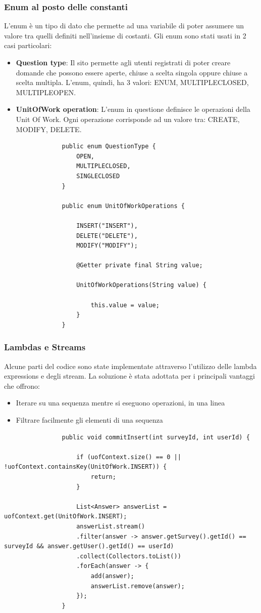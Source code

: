 \documentclass[12pt]{article}
\begin{document}
			\subsubsection{Enum al posto delle constanti}
			L'enum è un tipo di dato che permette ad una variabile di poter assumere un valore tra quelli definiti nell'insieme di costanti. Gli enum sono stati usati in 2 casi particolari:
			\begin{itemize}
				\item \textbf{Question type}: Il sito permette agli utenti registrati di poter creare domande che possono essere aperte, chiuse a scelta singola oppure chiuse a scelta multipla. L'enum, quindi, ha 3 valori: ENUM, MULTIPLECLOSED, MULTIPLEOPEN.
				\item \textbf{UnitOfWork operation}: L'enum in questione definisce le operazioni della Unit Of Work. Ogni operazione corrisponde ad un valore tra: CREATE, MODIFY, DELETE.
			\end{itemize}
			\begin{lstlisting}
				public enum QuestionType {
					OPEN,
					MULTIPLECLOSED,
					SINGLECLOSED
				}
				
				public enum UnitOfWorkOperations {
					
					INSERT("INSERT"),
					DELETE("DELETE"),
					MODIFY("MODIFY");
					
					@Getter	private final String value;
					
					UnitOfWorkOperations(String value) {
						
						this.value = value;
					}
				}
			\end{lstlisting}
			
			\subsubsection{Lambdas e Streams}
			Alcune parti del codice sono state implementate attraverso l'utilizzo delle lambda expressions e degli stream. La soluzione è stata adottata per i principali vantaggi che offrono: 
			\begin{itemize}
				\item Iterare su una sequenza mentre si eseguono operazioni, in una linea
				\item Filtrare facilmente gli elementi di una sequenza
			\end{itemize}
			\begin{lstlisting}
				public void commitInsert(int surveyId, int userId) {
					
					if (uofContext.size() == 0 || !uofContext.containsKey(UnitOfWork.INSERT)) {
						return;
					}
					
					List<Answer> answerList = uofContext.get(UnitOfWork.INSERT);
					answerList.stream()
					.filter(answer -> answer.getSurvey().getId() == surveyId && answer.getUser().getId() == userId)
					.collect(Collectors.toList())
					.forEach(answer -> {
						add(answer);
						answerList.remove(answer);
					});
				}
			\end{lstlisting}
			
			
			
		
\end{document}
